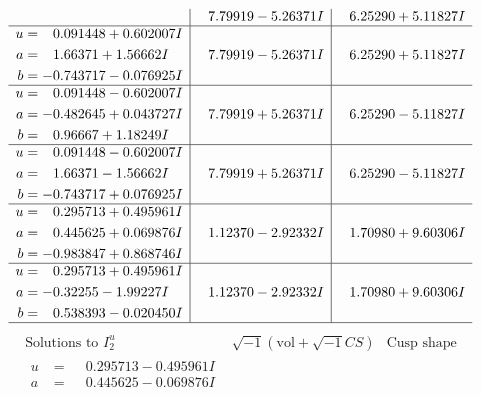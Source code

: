 \documentclass[1p]{elsarticle_modified}
\theoremstyle{definition}
\newcommand{\I}{\sqrt{-1}}
\begin{document}
$$\begin{array}{c|c|c}
 & \phantom{-}7.79919 - 5.26371 I & \phantom{-}6.25290 + 5.11827 I \\ \hline\begin{aligned}
u &= \phantom{-}0.091448 + 0.602007 I \\
a &= \phantom{-}1.66371 + 1.56662 I \\
b &= -0.743717 - 0.076925 I\end{aligned}
 & \phantom{-}7.79919 - 5.26371 I & \phantom{-}6.25290 + 5.11827 I \\ \hline\begin{aligned}
u &= \phantom{-}0.091448 - 0.602007 I \\
a &= -0.482645 + 0.043727 I \\
b &= \phantom{-}0.96667 + 1.18249 I\end{aligned}
 & \phantom{-}7.79919 + 5.26371 I & \phantom{-}6.25290 - 5.11827 I \\ \hline\begin{aligned}
u &= \phantom{-}0.091448 - 0.602007 I \\
a &= \phantom{-}1.66371 - 1.56662 I \\
b &= -0.743717 + 0.076925 I\end{aligned}
 & \phantom{-}7.79919 + 5.26371 I & \phantom{-}6.25290 - 5.11827 I \\ \hline\begin{aligned}
u &= \phantom{-}0.295713 + 0.495961 I \\
a &= \phantom{-}0.445625 + 0.069876 I \\
b &= -0.983847 + 0.868746 I\end{aligned}
 & \phantom{-}1.12370 - 2.92332 I & \phantom{-}1.70980 + 9.60306 I \\ \hline\begin{aligned}
u &= \phantom{-}0.295713 + 0.495961 I \\
a &= -0.32255 - 1.99227 I \\
b &= \phantom{-}0.538393 - 0.020450 I\end{aligned}
 & \phantom{-}1.12370 - 2.92332 I & \phantom{-}1.70980 + 9.60306 I\\
 \hline 
 \end{array}$$\newpage$$\begin{array}{c|c|c}  
\text{Solutions to }I^u_{2}& \I (\text{vol} + \sqrt{-1}CS) & \text{Cusp shape}\\
 \hline 
\begin{aligned}
u &= \phantom{-}0.295713 - 0.495961 I \\
a &= \phantom{-}0.445625 - 0.069876 I \\

\end{aligned}
\end{array}$$
\end{document}
